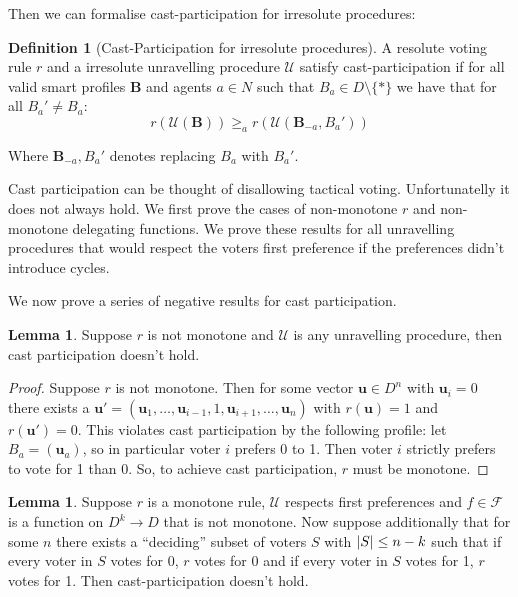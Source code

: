 \documentclass[11pt,a4paper, titlepage]{article}
\DeclarePairedDelimiter\abs{\lvert}{\rvert}
\theoremstyle{definition}
\newtheorem{definition}[theorem]{Definition}
\newtheorem{lemma}[theorem]{Lemma}
\let\vec\mathbf
\begin{document}
Then we can formalise cast-participation for irresolute procedures:

\begin{definition}[Cast-Participation for irresolute procedures]
    A resolute voting rule $r$ and a irresolute unravelling procedure $\mathcal{U}$ satisfy cast-participation if for all valid smart profiles $\mathbf{B}$ and agents $a \in N$ such that $B_a \in D \setminus \{*\}$ we have that for all $B_a' \neq B_a$:
    \[
        r(\mathcal{U}(\mathbf{B})) \geq_a r(\mathcal{U}(\mathbf{B}_{-a}, B_a'))
    \]

    Where $\mathbf{B}_{-a}, B_a'$ denotes replacing $B_a$ with $B_a'$. 
\end{definition}

Cast participation can be thought of disallowing tactical voting. Unfortunatelly it does not always hold. 
We first prove the cases of non-monotone $r$ and non-monotone delegating functions. 
We prove these results for all unravelling procedures that would respect the voters first preference if the preferences didn't introduce cycles.

We now prove a series of negative results for cast participation.

\begin{lemma} Suppose $r$ is not monotone and $\mathcal{U}$ is any unravelling procedure, then cast participation doesn't hold.
\end{lemma}

\begin{proof}
    Suppose $r$ is not monotone. Then for some vector $\vec{u} \in D^n$ with $\vec{u}_i = 0$ there exists a $\vec{u}' = (\vec{u}_1, \ldots, \vec{u}_{i-1}, 1, \vec{u}_{i+1}, \ldots, \vec{u}_n )$ with $r(\vec{u}) = 1$ and $r(\vec{u}') = 0$. This violates cast participation by the following profile: let $B_a = (\vec{u}_a)$, so in particular voter $i$ prefers 0 to 1. Then voter $i$ strictly prefers to vote for 1 than 0. So, to achieve cast participation, $r$ must be monotone. 
\end{proof}

\begin{lemma}
    Suppose $r$ is a monotone rule, $\mathcal{U}$ respects first preferences and $f \in \mathcal{F}$ is a function on $D^k \longrightarrow D$ that is not monotone. Now suppose additionally that for some $n$ there exists a ``deciding'' subset of voters $S$ with $\abs{S} \leq n - k$ such that if every voter in $S$ votes for 0, $r$ votes for 0 and if every voter in $S$ votes for 1, $r$ votes for 1. Then cast-participation doesn't hold.
\end{lemma}
\end{document}
